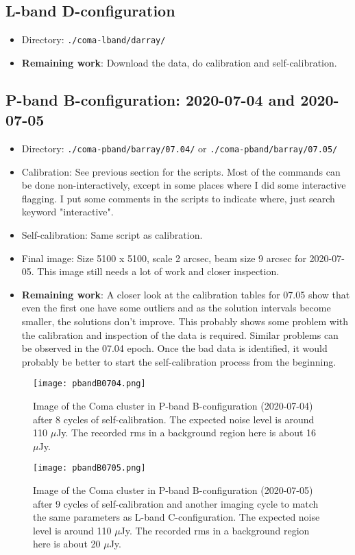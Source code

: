 \documentclass[11pt,letterpaper]{article}
\begin{document}
\subsection{L-band D-configuration}
\begin{itemize}
    \item Directory: \verb|./coma-lband/darray/|
    \item \textbf{Remaining work}: Download the data, do calibration and self-calibration.
\end{itemize}

\subsection{P-band B-configuration: 2020-07-04 and 2020-07-05}
\begin{itemize}
    \item Directory: \verb|./coma-pband/barray/07.04/| or \verb|./coma-pband/barray/07.05/|
    \item Calibration: See previous section for the scripts. Most of the commands can be done non-interactively, except in some places where I did some interactive flagging. I put some comments in the scripts to indicate where, just search keyword "interactive".
    \item Self-calibration: Same script as calibration.
    \item Final image: Size 5100 x 5100, scale 2 arcsec, beam size 9 arcsec for 2020-07-05. This image still needs a lot of work and closer inspection.
    \item \textbf{Remaining work}: A closer look at the calibration tables for 07.05 show that even the first one have some outliers and as the solution intervals become smaller, the solutions don't improve. This probably shows some problem with the calibration and inspection of the data is required. Similar problems can be observed in the 07.04 epoch. Once the bad data is identified, it would probably be better to start the self-calibration process from the beginning. 
\end{itemize}
\begin{figure}[t]
    \centering
    \texttt{[image: pbandB0704.png]}
    \caption{Image of the Coma cluster in P-band B-configuration (2020-07-04) after 8 cycles of self-calibration. The expected noise level is around 110 $\mu$Jy. The recorded rms in a background region here is about 16 $\mu$Jy.}
    \label{fig:lbandC0309}
\end{figure}
\begin{figure}[t]
    \centering
    \texttt{[image: pbandB0705.png]}
    \caption{Image of the Coma cluster in P-band B-configuration (2020-07-05) after 9 cycles of self-calibration and another imaging cycle to match the same parameters as L-band C-configuration. The expected noise level is around 110 $\mu$Jy. The recorded rms in a background region here is about 20 $\mu$Jy.}
    \label{fig:lbandC0309}
\end{figure}
\end{document}
